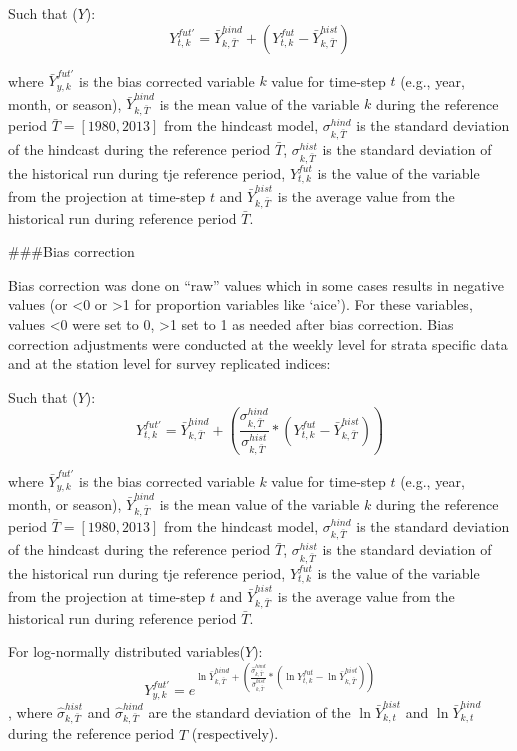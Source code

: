 \documentclass[
]{article}
\begin{document}
Such that (\(Y\)):
\[{Y}^{fut'}_{t,k} =\bar{Y}^{hind}_{k,\bar{T}} +({Y}^{fut}_{t,k}-\bar{Y}^{hist}_{k,\bar{T}})\]

where \(\bar{Y}^{fut'}_{y,k}\) is the bias corrected variable \(k\)
value for time-step \(t\) (e.g., year, month, or season),
\(\bar{Y}^{hind}_{k,\bar{T}}\) is the mean value of the variable \(k\)
during the reference period \(\bar{T}=[1980,2013]\) from the hindcast
model, \(\sigma^{hind}_{k,\bar{T}}\) is the standard deviation of the
hindcast during the reference period \(\bar{T}\),
\(\sigma^{hist}_{k,\bar{T}}\) is the standard deviation of the
historical run during tje reference period, \({Y}^{fut}_{t,k}\) is the
value of the variable from the projection at time-step \(t\) and
\(\bar{Y}^{hist}_{k,\bar{T}}\) is the average value from the historical
run during reference period \(\bar{T}\).

\#\#\#Bias correction

Bias correction was done on ``raw'' values which in some cases results
in negative values (or \textless0 or \textgreater1 for proportion
variables like `aice'). For these variables, values \textless0 were set
to 0, \textgreater1 set to 1 as needed after bias correction. Bias
correction adjustments were conducted at the weekly level for strata
specific data and at the station level for survey replicated indices:

Such that (\(Y\)):
\[{Y}^{fut'}_{t,k} =\bar{Y}^{hind}_{k,\bar{T}} +\left( \frac{\sigma^{hind}_{k,\bar{T}}}{\sigma^{hist}_{k,\bar{T}}}*({Y}^{fut}_{t,k}-\bar{Y}^{hist}_{k,\bar{T}})  \right )\]

where \(\bar{Y}^{fut'}_{y,k}\) is the bias corrected variable \(k\)
value for time-step \(t\) (e.g., year, month, or season),
\(\bar{Y}^{hind}_{k,\bar{T}}\) is the mean value of the variable \(k\)
during the reference period \(\bar{T}=[1980,2013]\) from the hindcast
model, \(\sigma^{hind}_{k,\bar{T}}\) is the standard deviation of the
hindcast during the reference period \(\bar{T}\),
\(\sigma^{hist}_{k,\bar{T}}\) is the standard deviation of the
historical run during tje reference period, \({Y}^{fut}_{t,k}\) is the
value of the variable from the projection at time-step \(t\) and
\(\bar{Y}^{hist}_{k,\bar{T}}\) is the average value from the historical
run during reference period \(\bar{T}\).

For log-normally distributed variables(\(Y\)):
\[{Y}^{fut'}_{y,k} =e^{\ln\bar{Y}^{hind}_{k,\bar{T}} +\left( \frac{\hat{\sigma}^{hind}_{k,\bar{T}}}{\hat{\sigma}^{hist}_{k,\bar{T}}}*(\ln{Y}^{fut}_{t,k}-\ln\bar{Y}^{hist}_{k,\bar{T}})  \right )}\],
where \(\hat\sigma^{hist}_{k,\bar{T}}\) and
\(\hat\sigma^{hind}_{k,\bar{T}}\) are the standard deviation of the
\(\ln\bar{Y}^{hist}_{k,t}\) and \(\ln\bar{Y}^{hind}_{k,t}\) during the
reference period \(\hat{T}\) (respectively).
\end{document}
